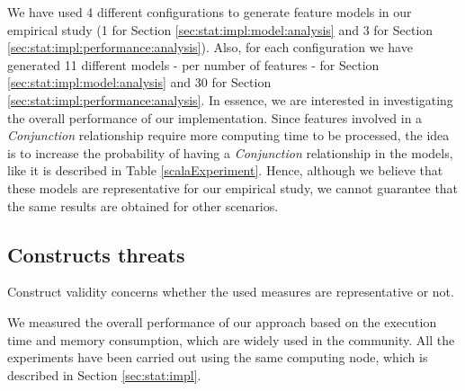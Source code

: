 We have used 4 different configurations to generate feature models in our empirical study (1 for Section \ref{sec:stat:impl:model:analysis} and 3 for Section \ref{sec:stat:impl:performance:analysis}).
Also, for each configuration we have generated 11 different models - per number of features - for Section \ref{sec:stat:impl:model:analysis} and 30 for Section \ref{sec:stat:impl:performance:analysis}. In essence, we are interested in investigating the overall performance of our implementation. Since features involved in a \textit{Conjunction} relationship require more computing time to be processed, the idea is to increase the probability of having a \textit{Conjunction} relationship in the models, like it is described in Table \ref{scalaExperiment}. Hence, although we believe that these models are representative for our empirical study, we cannot guarantee that the same results are obtained for other scenarios.


\subsection{Constructs threats}

Construct validity concerns whether the used measures are representative or not.

We measured the overall performance of our approach based on the execution time and memory consumption,
which are widely used in the community. All the experiments have been carried out using the same computing node, which is described in Section \ref{sec:stat:impl}.



